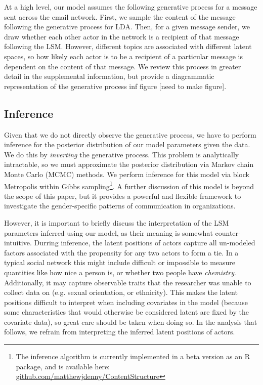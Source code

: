 \documentclass{pnastwo}
\begin{document}
\begin{article}
At a high level, our model assumes the following generative process for a message sent across the email network. First, we sample the content of the message following the generative process for LDA. Then, for a given message sender, we draw whether each other actor in the network is a recipient of that message following the LSM. However, different topics are associated with different latent spaces, so how likely each actor is to be a recipient of a particular message is dependent on the content of that message. We review this process in greater detail in the supplemental information, but provide a diagrammatic representation of the generative process inf figure [need to make figure].


\subsection{Inference}
Given that we do not directly observe the generative process, we have to perform inference for the posterior distribution of our model parameters given the data. We do this by \emph{inverting} the generative process. This problem is analytically intractable, so we must approximate the posterior distribution via Markov chain Monte Carlo (MCMC) methods. We perform inference for this model via block Metropolis within Gibbs sampling\footnote{The inference algorithm is currently implemented in a beta version as an R package, and is available here: \href{https://github.com/matthewjdenny/ContentStructure}{github.com/matthewjdenny/ContentStructure}}. A further discussion of this model is beyond the scope of this paper, but it provides a powerful and flexible framework to investigate the gender-specific patterns of communication in organizations.

However, it is important to briefly discuss the interpretation of the LSM parameters inferred using our model, as their meaning is somewhat counter-intuitive. Durring inference, the latent positions of actors capture all un-modeled factors associated with the propensity for any two actors to form a tie. In a typical social network this might include difficult or impossible to measure quantities like how nice a person is, or whether two people have \emph{chemistry}. Additionally, it may capture observable traits that the researcher was unable to collect data on (e.g. sexual orientation, or ethnicity). This makes the latent positions difficult to interpret when including covariates in the model (because some characteristics that would otherwise be considered latent are fixed by the covariate data), so great care should be taken when doing so. In the analysis that follows, we refrain from interpreting the inferred latent positions of actors. 


\end{article}
\end{document}
